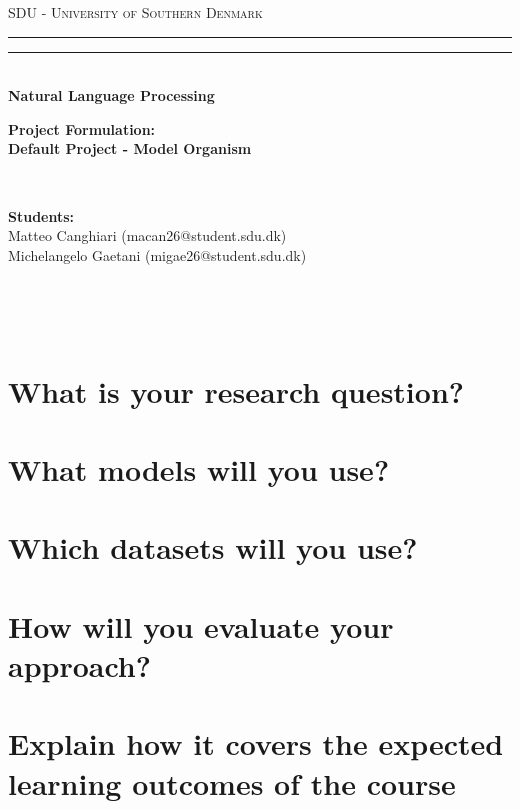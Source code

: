 \documentclass[12pt,a4paper,oneside]{book}
\begin{document}
\pagestyle{empty}
\begin{titlepage}
\begin{center}
    {{\Large{\textsc{SDU - University of Southern Denmark}}}}
    \rule[0.1cm]{\textwidth}{0.1mm}
    \rule[0.5cm]{\textwidth}{0.6mm}\\
    {\small{\bf Natural Language Processing}}
\end{center}

\vspace{45mm}

\begin{center}
    \large \textbf{Project Formulation: \\ Default Project - Model Organism}
\end{center}

\vspace{60mm}
\par
\noindent
\begin{minipage}[t]{0.04\textwidth}
~
\end{minipage}
\begin{minipage}[t]{0.8\textwidth}
{{\textbf{Students:}\\
Matteo Canghiari (macan26@student.sdu.dk) \\ Michelangelo Gaetani (migae26@student.sdu.dk)}}
\end{minipage}
\begin{minipage}[t]{0.04\textwidth}
~
\end{minipage}

\vspace{30mm}

\end{titlepage}

\restoregeometry

\pagestyle{empty}
\newpage~\newpage
\thispagestyle{empty}

\clearpage
{}
\pagestyle{plain}

\chapter{What is your research question?}


\chapter{What models will you use?}


\chapter{Which datasets will you use?}


\chapter{How will you evaluate your approach?}


\chapter{Explain how it covers the expected learning outcomes of the course}

\end{document}

